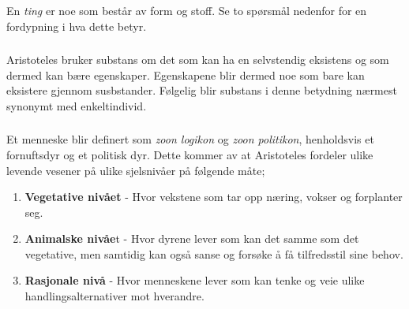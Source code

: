 \documentclass[a4paper]{IEEEtran}
\begin{document}
        \subsubsection{}
        En \textit{ting} er noe som består av form og stoff. Se to spørsmål 
        nedenfor for en fordypning i hva dette betyr. \medskip

        \subsubsection{}
        Aristoteles bruker substans om det som kan ha en selvstendig 
        eksistens og som dermed kan bære egenskaper. Egenskapene blir dermed 
        noe som bare kan eksistere gjennom susbstander. Følgelig blir 
        substans i denne betydning nærmest synonymt med enkeltindivid. 
        \cite{snl_substans} \medskip

        \subsubsection{}
        Et menneske blir definert som \textit{zoon logikon} og \textit{zoon politikon},
        henholdsvis et fornuftsdyr og et politisk dyr. Dette kommer av at 
        Aristoteles fordeler ulike levende vesener på ulike sjelsnivåer på følgende
        måte;

        \begin{enumerate}
            \item \textbf{Vegetative nivået} - Hvor vekstene som tar opp næring,
            vokser og forplanter seg. 
            \item \textbf{Animalske nivåe}t - Hvor dyrene lever som kan det samme som 
            det vegetative, men samtidig kan også sanse og forsøke å få
            tilfredsstil sine behov.
            \item \textbf{Rasjonale nivå} - Hvor menneskene lever som 
            kan tenke og veie ulike handlingsalternativer mot hverandre.
        \end{enumerate} \medskip
\end{document}
